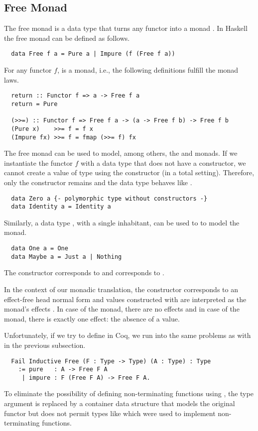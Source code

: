\subsection{Free Monad}
\label{sec:preliminaries:modeling-effects:free}
The free monad is a data type that turns any functor into a monad \cite[p.~7]{Dylus:2018}.
In Haskell the free monad can be defined as follows.
\begin{verbatim}
  data Free f a = Pure a | Impure (f (Free f a))
\end{verbatim}
For any functor $f$,  is a monad, i.e., the following definitions fulfill the monad laws.
\begin{verbatim}
  return :: Functor f => a -> Free f a
  return = Pure

  (>>=) :: Functor f => Free f a -> (a -> Free f b) -> Free f b
  (Pure x)    >>= f = f x
  (Impure fx) >>= f = fmap (>>= f) fx
\end{verbatim}
The free monad can be used to model, among others, the  and  monads.
If we instantiate the functor $f$ with a data type  that does not have a constructor, we cannot create a value of type  using the  constructor (in a total setting).
Therefore, only the  constructor remains and the data type behaves like .
\begin{verbatim}
  data Zero a {- polymorphic type without constructors -}
  data Identity a = Identity a
\end{verbatim}
Similarly, a data type , with a single inhabitant, can be used to to model the  monad.
\begin{verbatim}
  data One a = One
  data Maybe a = Just a | Nothing
\end{verbatim}
The  constructor corresponds to  and  corresponds to .

In the context of our monadic translation, the  constructor corresponds to an effect-free head normal form and values constructed with  are interpreted as the monad's effects \cite[p.~127]{Christiansen:2019}.
In case of the  monad, there are no effects and in case of the  monad, there is exactly one effect: the absence of a value.

Unfortunately, if we try to define  in Coq, we run into the same problems as with  in the previous subsection.
\begin{verbatim}
  Fail Inductive Free (F : Type -> Type) (A : Type) : Type
    := pure   : A -> Free F A
     | impure : F (Free F A) -> Free F A.
\end{verbatim}
To eliminate the possibility of defining non-terminating functions using , the type argument  is replaced by a container data structure that models the original functor but does not permit types like  which were used to implement non-terminating functions.

